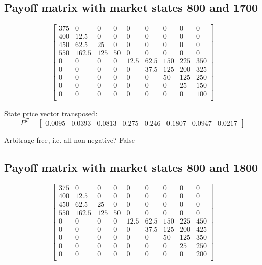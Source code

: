 \documentclass{article}
\begin{document}
\subsection{Payoff matrix with market states 800 and 1700}
\[
    \begin{bmatrix}
        375 & 0     & 0   & 0  & 0    & 0    & 0   & 0   & 0   \\
        400 & 12.5  & 0   & 0  & 0    & 0    & 0   & 0   & 0   \\
        450 & 62.5  & 25  & 0  & 0    & 0    & 0   & 0   & 0   \\
        550 & 162.5 & 125 & 50 & 0    & 0    & 0   & 0   & 0   \\
        0   & 0     & 0   & 0  & 12.5 & 62.5 & 150 & 225 & 350 \\
        0   & 0     & 0   & 0  & 0    & 37.5 & 125 & 200 & 325 \\
        0   & 0     & 0   & 0  & 0    & 0    & 50  & 125 & 250 \\
        0   & 0     & 0   & 0  & 0    & 0    & 0   & 25  & 150 \\
        0   & 0     & 0   & 0  & 0    & 0    & 0   & 0   & 100 \\
    \end{bmatrix}
\]

State price vector transposed:
\[
    P^T = \begin{bmatrix} 0.0095 & 0.0393 & 0.0813 & 0.275 & 0.246 & 0.1807 & 0.0947 & 0.0217 \end{bmatrix}
\]


Arbitrage free, i.e. all non-negative? False

\subsection{Payoff matrix with market states 800 and 1800}
\[
    \begin{bmatrix}
        375 & 0     & 0   & 0  & 0    & 0    & 0   & 0   & 0   \\
        400 & 12.5  & 0   & 0  & 0    & 0    & 0   & 0   & 0   \\
        450 & 62.5  & 25  & 0  & 0    & 0    & 0   & 0   & 0   \\
        550 & 162.5 & 125 & 50 & 0    & 0    & 0   & 0   & 0   \\
        0   & 0     & 0   & 0  & 12.5 & 62.5 & 150 & 225 & 450 \\
        0   & 0     & 0   & 0  & 0    & 37.5 & 125 & 200 & 425 \\
        0   & 0     & 0   & 0  & 0    & 0    & 50  & 125 & 350 \\
        0   & 0     & 0   & 0  & 0    & 0    & 0   & 25  & 250 \\
        0   & 0     & 0   & 0  & 0    & 0    & 0   & 0   & 200 \\
    \end{bmatrix}
\]
\end{document}
